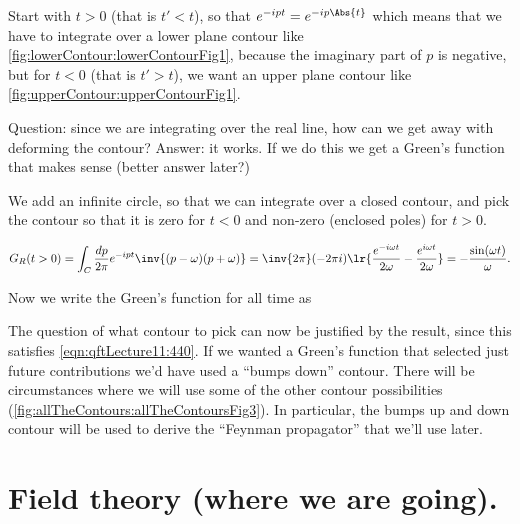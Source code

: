 Start with \( t > 0 \) (that is \( t' < t \)), so that \( e^{-i p t} = e^{-i p \Abs{t}} \) which means that we have to integrate over a lower plane contour like \cref{fig:lowerContour:lowerContourFig1}, because the imaginary part of \( p \) is negative, but for \( t < 0 \) (that is \( t' > t \)), we want an upper plane contour like \cref{fig:upperContour:upperContourFig1}.


Question: since we are integrating over the real line, how can we get away with deforming the contour?
Answer: it works.  If we do this we get a Green's function that makes sense (better answer later?)

We add an infinite circle, so that we can integrate over a closed contour, and pick the contour so that it is zero for \( t < 0 \) and non-zero (enclosed poles) for \( t > 0 \).

\begin{dmath}\label{eqn:qftLecture11:640}
G_R(t > 0)
= \int_C \frac{dp}{2 \pi} e^{-i p t}
\inv{(p - \omega)(p + \omega)}
=
\inv{2 \pi} (-2 \pi i) \lr{
   \frac{e^{-i \omega t}}{2 \omega}
   -
   \frac{e^{i \omega t}}{2 \omega}
}
=
-\frac{\sin(\omega t)}{\omega}.
\end{dmath}

Now we write the Green's function for all time as

The question of what contour to pick can now be justified by the result, since this satisfies \cref{eqn:qftLecture11:440}.  If we wanted a Green's function that selected just future contributions we'd have used a ``bumps down'' contour.  There will be circumstances where we will use some of the other contour possibilities (\cref{fig:allTheContours:allTheContoursFig3}).  In particular, the bumps up and down contour will be used to derive the ``Feynman propagator'' that we'll use later.

\section{Field theory (where we are going).}

